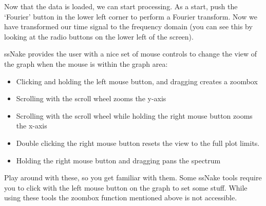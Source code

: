 \documentclass[11pt,a4paper]{article}
\begin{document}
Now that the data is loaded, we can start processing. As a start, push the `Fourier' button in the
lower left corner to perform a Fourier transform. Now we have transformed our time signal to the
frequency domain (you can see this by looking at the radio buttons on the lower left of the screen).
\begin{tcolorbox}[breakable,colback=green!5,colframe=MyBlueD,title=\large Mouse button
  controls,boxrule=2mm,colback=MyBlueD!30!white]
ssNake provides the user with a nice set of mouse controls to change the view of the graph when the mouse is within the graph area:
\begin{itemize}
\item Clicking and holding the left mouse button, and dragging creates a zoombox
\item Scrolling with the scroll wheel zooms the y-axis
\item Scrolling with the scroll wheel while holding the right mouse button zooms the x-axis
\item Double clicking the right mouse button resets the view to the full plot limits.
\item Holding the right mouse button and dragging pans the spectrum
\end{itemize}
Play around with these, so you get familiar with them. Some ssNake tools require you to click with the left mouse button on the graph to set some stuff. While using these tools the zoombox function mentioned above is not accessible.
\end{tcolorbox}
\end{document}

